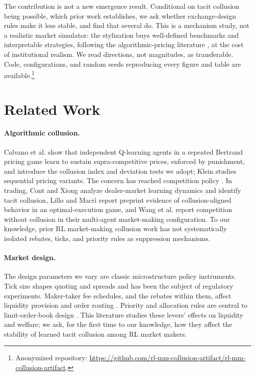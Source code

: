 \documentclass[sigconf]{acmart}
\begin{document}
The contribution is not a new emergence result. Conditional on tacit collusion being possible, which prior work establishes, we ask whether exchange-design rules make it less stable, and find that several do. This is a mechanism study, not a realistic market simulator: the stylization buys well-defined benchmarks and interpretable strategies, following the algorithmic-pricing literature \cite{calvano2020}, at the cost of institutional realism. We read directions, not magnitudes, as transferable. Code, configurations, and random seeds reproducing every figure and table are available.\footnote{Anonymized repository: \url{https://github.com/rl-mm-collusion-artifact/rl-mm-collusion-artifact}.}

\section{Related Work}

\paragraph{Algorithmic collusion.} Calvano et al. \cite{calvano2020} show that independent Q-learning agents in a repeated Bertrand pricing game learn to sustain supra-competitive prices, enforced by punishment, and introduce the collusion index and deviation tests we adopt; Klein \cite{klein2021} studies sequential pricing variants. The concern has reached competition policy \cite{oecd2017,ezrachi2016}. In trading, Cont and Xiong \cite{cont2024} analyze dealer-market learning dynamics and identify tacit collusion, Lillo and Macr\`i \cite{macri2024} report preprint evidence of collusion-aligned behavior in an optimal-execution game, and Wang et al. \cite{wang2025} report competition without collusion in their multi-agent market-making configuration. To our knowledge, prior RL market-making collusion work has not systematically isolated rebates, ticks, and priority rules as suppression mechanisms.

\paragraph{Market design.} The design parameters we vary are classic microstructure policy instruments. Tick size shapes quoting and spreads \cite{harris1994} and has been the subject of regulatory experiments. Maker-taker fee schedules, and the rebates within them, affect liquidity provision and order routing \cite{colliard2012,battalio2016}. Priority and allocation rules are central to limit-order-book design \cite{glosten1994}. This literature studies these levers' effects on liquidity and welfare; we ask, for the first time to our knowledge, how they affect the stability of learned tacit collusion among RL market makers.
\end{document}
